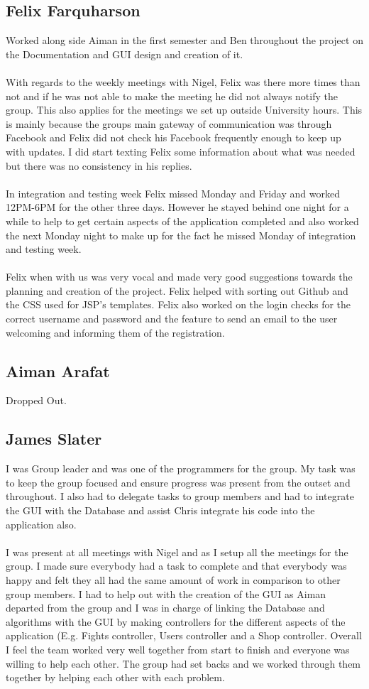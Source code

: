 \documentclass[titlepage]{article}
\begin{document}
{\subsection {Felix Farquharson}
Worked along side Aiman in the first semester and Ben throughout the project on the Documentation and GUI design and creation of it.
\\
\\
With regards to the weekly meetings with Nigel, Felix was there more times than not and if he was not able to make the meeting he did not always notify the group. This also applies for the meetings we set up outside University hours. This is mainly because the groups main gateway of communication was through Facebook and Felix did not check his Facebook frequently enough to keep up with updates. I did start texting Felix some information about what was needed but there was no consistency in his replies.
\\
\\
In integration and testing week Felix missed Monday and Friday and worked 12PM-6PM for the other three days. However he stayed behind one night for a while to help to get certain aspects of the application completed and also worked the next Monday night to make up for the fact he missed Monday of integration and testing week.
\\
\\
Felix when with us was very vocal and made very good suggestions 
towards the planning and creation of the project. Felix helped with sorting out Github and the CSS used for JSP’s templates. Felix 
also worked on the login checks for the correct username and password and the feature to send an email to the user welcoming and informing them of the registration. 
\subsection{Aiman Arafat}
Dropped Out.
\subsection {James Slater}
I was Group leader and was one of the programmers for the group. My 
task was to keep the group focused and ensure progress was present from the outset and throughout. I also had to delegate tasks to group members and had to integrate the GUI with the Database and assist Chris integrate his code into the application also.
\\
\\
I was present at all meetings with Nigel and as I setup all the meetings for the group. I made sure everybody had a task to complete and that everybody was happy and felt they all had the same amount of work in comparison to other group members. I had to help out with the creation of the GUI as Aiman departed from the group and I was in charge of linking the Database and algorithms with the GUI by making controllers for the different aspects of the application (E.g. Fights controller, Users controller and a Shop controller. Overall I feel the team worked very well together from start to finish and everyone was willing to
help each other. The group had set backs and we worked through them together by
helping each other with each problem.
}
\end{document}
